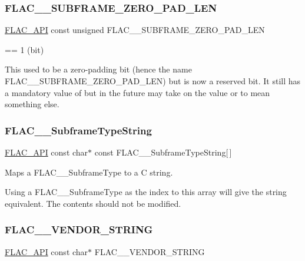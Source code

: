 \subsubsection{\texorpdfstring{FLAC\_\_SUBFRAME\_ZERO\_PAD\_LEN}{FLAC\_\_SUBFRAME\_ZERO\_PAD\_LEN}}
{\footnotesize\ttfamily \mbox{\hyperlink{group__flac__export_ga56ca07df8a23310707732b1c0007d6f5}{F\+L\+A\+C\+\_\+\+A\+PI}} const unsigned F\+L\+A\+C\+\_\+\+\_\+\+S\+U\+B\+F\+R\+A\+M\+E\+\_\+\+Z\+E\+R\+O\+\_\+\+P\+A\+D\+\_\+\+L\+EN}

== 1 (bit)

This used to be a zero-\/padding bit (hence the name F\+L\+A\+C\+\_\+\+\_\+\+S\+U\+B\+F\+R\+A\+M\+E\+\_\+\+Z\+E\+R\+O\+\_\+\+P\+A\+D\+\_\+\+L\+EN) but is now a reserved bit. It still has a mandatory value of {} but in the future may take on the value {} or {} to mean something else. \mbox{\label{group__flac__format_gabc358f252630dfc52e875eb05c3b0fd9}} 
\subsubsection{\texorpdfstring{FLAC\_\_SubframeTypeString}{FLAC\_\_SubframeTypeString}}
{\footnotesize\ttfamily \mbox{\hyperlink{group__flac__export_ga56ca07df8a23310707732b1c0007d6f5}{F\+L\+A\+C\+\_\+\+A\+PI}} const char$\ast$ const F\+L\+A\+C\+\_\+\+\_\+\+Subframe\+Type\+String\mbox{[}$\,$\mbox{]}}

Maps a F\+L\+A\+C\+\_\+\+\_\+\+Subframe\+Type to a C string.

Using a F\+L\+A\+C\+\_\+\+\_\+\+Subframe\+Type as the index to this array will give the string equivalent. The contents should not be modified. \mbox{\label{group__flac__format_gac05d5441acd3daad33d287165c450a05}} 
\subsubsection{\texorpdfstring{FLAC\_\_VENDOR\_STRING}{FLAC\_\_VENDOR\_STRING}}
{\footnotesize\ttfamily \mbox{\hyperlink{group__flac__export_ga56ca07df8a23310707732b1c0007d6f5}{F\+L\+A\+C\+\_\+\+A\+PI}} const char$\ast$ F\+L\+A\+C\+\_\+\+\_\+\+V\+E\+N\+D\+O\+R\+\_\+\+S\+T\+R\+I\+NG}

